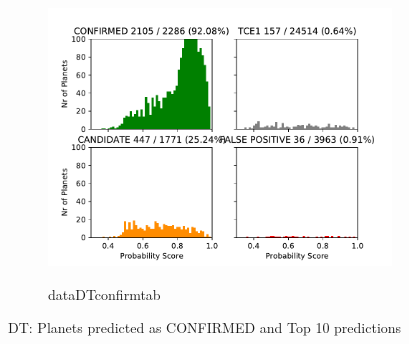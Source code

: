\begin{figure}[H]
                \centering
                \begin{subfigure}{1\textwidth}
                \includegraphics[width = 1\textwidth]{data/DT_pred_CONFIRMED.pdf}
                \end{subfigure}
                \begin{subfigure}{1\textwidth}
                \csname dataDTconfirmtab\endcsname
                \end{subfigure}
                \caption{DT: Planets predicted as CONFIRMED and Top 10 predictions}
                \label{fig:data/DT_pred_CONFIRMED}
                \end{figure}